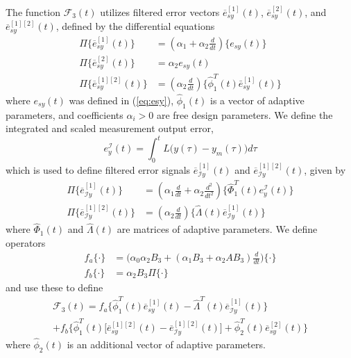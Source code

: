 \documentclass[english]{ifacconf}
\begin{document}
The function $\mathcal{F}_3(t)$ utilizes filtered error vectors $\overline{e}_{sy}^{[1]}(t)$, $\overline{e}_{sy}^{[2]}(t)$, and $\overline{e}_{sy}^{[1][2]}(t)$, defined by the differential equations
\begin{equation}
\begin{aligned} 
	\Pi \big \{ \overline{e}_{sy}^{[1]}(t) \big \} & = (\alpha_1 + \alpha_2 \frac{d}{dt}) \big \{ e_{sy}(t) \big \} \\
	\Pi \big \{ \overline{e}_{sy}^{[2]}(t) \big \} & = \alpha_2 e_{sy}(t) \\
	\Pi \big \{ \overline{e}_{sy}^{[1][2]}(t) \big \} & = (\alpha_2 \frac{d}{dt}) \big \{ \hat{\phi}_1^T(t) \bar{e}_{sy}^{[1]}(t) \big \}
\end{aligned} \label{eq:esy_rd3}
\end{equation}
where $e_{sy}(t)$ was defined in (\ref{eq:esy}), $\hat{\phi}_1(t)$ is a vector of adaptive parameters, and coefficients $\alpha_i > 0$ are free design parameters. We define the integrated and scaled measurement output error, 
\begin{equation}
e_{y}^{\mathcal{I}}(t) = \int_0^{t} L\big (y(\tau) - y_m(\tau)\big) d\tau
\end{equation}
which is used to define filtered error signals $\overline{e}_{\mathcal{I}y}^{[1]} (t)$ and $\overline{e}_{\mathcal{I}y}^{[1][2]} (t)$, given by
\begin{equation}
\begin{aligned}
	\Pi \big \{  \overline{e}_{\mathcal{I}y}^{[1]} (t) \big \} &= (\alpha_1 \frac{d}{dt} + \alpha_2 \frac{d^2}{dt^2}) \big \{ \hat{\Phi}_1^T (t) e_{y}^{\mathcal{I}}(t) \big \} \\
	\Pi \big \{  \overline{e}_{\mathcal{I}y}^{[1][2]} (t) \big \} &= (\alpha_2 \frac{d}{dt}) \big \{ \hat{\Lambda}(t) \overline{e}_{\mathcal{I}y}^{[1]} (t) \big \}
\end{aligned} \label{eq:eIy_rd3}
\end{equation}
where $\hat{\Phi}_1(t)$ and $\hat{\Lambda}(t)$ are matrices of adaptive parameters. We define operators
\begin{equation}
\begin{aligned}
	f_a \{ \cdot \} &= \big(\alpha_0 \alpha_2 B_3 + (\alpha_1 B_3 + \alpha_2 A B_3)\frac{d}{dt} \big) \{ \cdot \} \\
	f_b \{ \cdot \} &= \alpha_2 B_3 \Pi \{ \cdot \}
\end{aligned}
\end{equation}
and use these to define
\begin{multline}
	\mathcal{F}_3(t) = f_a \big \{ \hat{\phi}_1^T(t) \overline{e}_{sy}^{[1]}(t) - \hat{\Lambda}^T(t) \overline{e}_{\mathcal{I}y}^{[1]} (t) \big \} \\
	+ f_b \big \{ \hat{\phi}_1^T(t) \big[\overline{e}_{sy}^{[1][2]}(t) -  \overline{e}_{\mathcal{I}y}^{[1][2]} (t) \big ] + \hat{\phi}_2^T (t) \overline{e}_{sy}^{[2]}(t) \big \} \label{eq:F3}
\end{multline}
where $\hat{\phi}_2(t)$ is an additional vector of adaptive parameters. 
\end{document}
